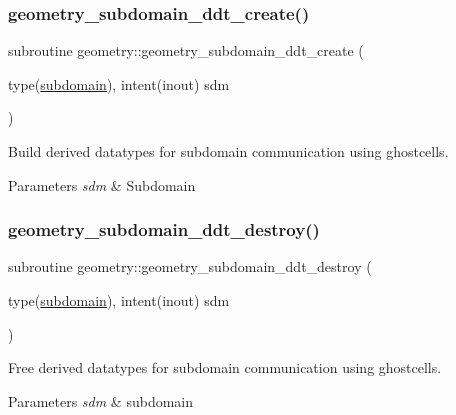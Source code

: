 \subsubsection{\texorpdfstring{geometry\+\_\+subdomain\+\_\+ddt\+\_\+create()}{geometry\_subdomain\_ddt\_create()}}
{\footnotesize\ttfamily subroutine geometry\+::geometry\+\_\+subdomain\+\_\+ddt\+\_\+create (\begin{DoxyParamCaption}\item[{type(\hyperlink{structgeometry_1_1subdomain}{subdomain}), intent(inout)}]{sdm }\end{DoxyParamCaption})}



Build derived datatypes for subdomain communication using ghostcells. 


\begin{DoxyParams}{Parameters}
{\em sdm} & Subdomain \\
\hline
\end{DoxyParams}
\mbox{\label{namespacegeometry_a29d3bd98ea090130609cf1dba291ceb4}} 
\subsubsection{\texorpdfstring{geometry\+\_\+subdomain\+\_\+ddt\+\_\+destroy()}{geometry\_subdomain\_ddt\_destroy()}}
{\footnotesize\ttfamily subroutine geometry\+::geometry\+\_\+subdomain\+\_\+ddt\+\_\+destroy (\begin{DoxyParamCaption}\item[{type(\hyperlink{structgeometry_1_1subdomain}{subdomain}), intent(inout)}]{sdm }\end{DoxyParamCaption})}



Free derived datatypes for subdomain communication using ghostcells. 


\begin{DoxyParams}{Parameters}
{\em sdm} & subdomain \\
\hline
\end{DoxyParams}
\mbox{\label{namespacegeometry_ab546189e0ddda7aea0d8cd6e479ff8f1}} 
